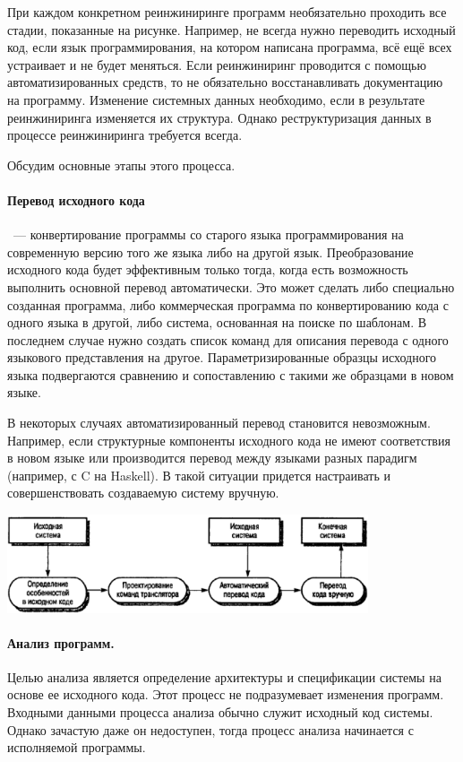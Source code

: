 \documentclass{../../text-style}
\begin{document}
При каждом конкретном реинжиниринге программ необязательно проходить все стадии, показанные на рисунке. Например, не всегда нужно переводить исходный код, если язык программирования, на котором написана программа, всё ещё всех устраивает и не будет меняться. Если реинжиниринг проводится с помощью автоматизированных средств, то не обязательно восстанавливать документацию на программу. Изменение системных данных необходимо, если в результате реинжиниринга изменяется их структура. Однако реструктуризация данных в процессе реинжиниринга требуется всегда.

Обсудим основные этапы этого процесса.

\paragraph{Перевод исходного кода}~--- конвертирование программы со старого языка программирования на современную версию того же языка либо на другой язык. Преобразование исходного кода будет эффективным только тогда, когда есть возможность выполнить основной перевод автоматически. Это может сделать либо специально созданная программа, либо коммерческая программа по конвертированию кода с одного языка в другой, либо система, основанная на поиске по шаблонам. В последнем случае нужно создать список команд для описания перевода с одного языкового представления на другое. Параметризированные образцы исходного языка подвергаются сравнению и сопоставлению с такими же образцами в новом языке.

В некоторых случаях автоматизированный перевод становится невозможным. Например, если структурные компоненты исходного кода не имеют соответствия в новом языке или производится перевод между языками разных парадигм (например, с C на Haskell). В такой ситуации придется настраивать и совершенствовать создаваемую систему вручную.

\begin{center}
    \includegraphics[width=0.8\textwidth]{sourceCodeTranslation.png}
\end{center}

\paragraph{Анализ программ.} Целью анализа является определение архитектуры и спецификации системы на основе ее исходного кода. Этот процесс не подразумевает изменения программ. Входными данными процесса анализа обычно служит исходный код системы. Однако зачастую даже он недоступен, тогда процесс анализа начинается с исполняемой программы. 
\end{document}
